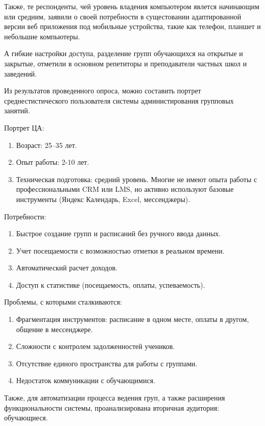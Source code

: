 \documentclass[a4paper,14pt,oneside]{extreport}
\begin{document}
Также, те респонденты, чей уровень владения компьютером явлется начинающим или средним, заявили о своей потребности в сущестовании адаптированной версии веб приложения под мобильные устройства, такие как телефон, планшет и небольшие компьютеры.

А гибкие настройки доступа, разделение групп обучающихся на открытые и закрытые, отметили в основном репетиторы и преподаватели частных школ и заведений.

Из результатов проведенного опроса, можно составить портрет среднестистического пользователя системы администирования групповых занятий. 
 
Портрет ЦА:

\begin{enumerate}
    \item Возраст: 25–35 лет.
    \item Опыт работы: 2-10 лет.
    \item Техническая подготовка: средний уровень.
Многие не имеют опыта работы с профессиональными CRM или LMS, но активно используют базовые инструменты (Яндекс Календарь, Excel, мессенджеры).
\end{enumerate}

Потребности:

\begin{enumerate}
    \item Быстрое создание групп и расписаний без ручного ввода данных.
    \item Учет посещаемости с возможностью отметки в реальном времени.
    \item Автоматический расчет доходов.
    \item Доступ к статистике (посещаемость, оплаты, успеваемость).
\end{enumerate}

Проблемы, с которыми сталкиваются:

\begin{enumerate}
    \item Фрагментация инструментов: расписание в одном месте, оплаты в другом, общение в мессенджере.
    \item Сложности с контролем задолженностей учеников.
    \item Отсутствие единого пространства для работы с группами.
    \item Недостаток коммуникации с обучающимися.
\end{enumerate}

Также, для автоматизации процесса ведения груп, а также расширения функциональности системы, проанализирована вторичная аудитория: обучающиеся.
\end{document}
